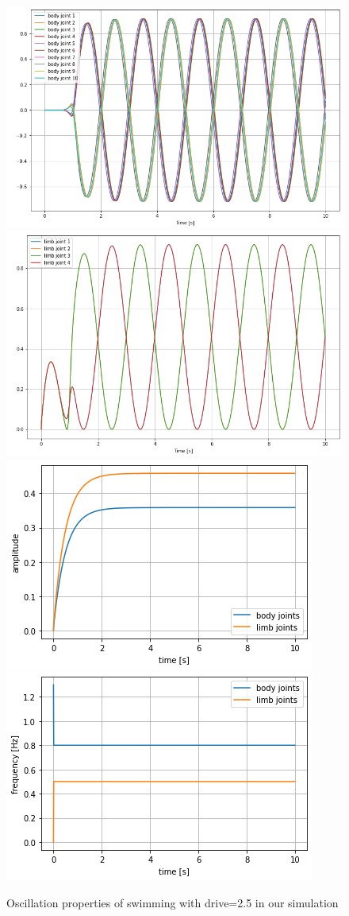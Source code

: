 \documentclass{cmc}
\begin{document}
\begin{figure}[H]
\centering
\includegraphics[height=0.3\columnwidth]{figures/8a_d25_spine.png}
\includegraphics[height=0.3\columnwidth]{figures/8a_d25_limb.png}
\includegraphics[height=0.3\columnwidth]{figures/8a_d25_amp.png}
\includegraphics[height=0.3\columnwidth]{figures/8a_d25_freq.png}
\caption{Oscillation properties of swimming with drive=2.5 in our simulation}
\label{a2}
\end{figure}
\end{document}
